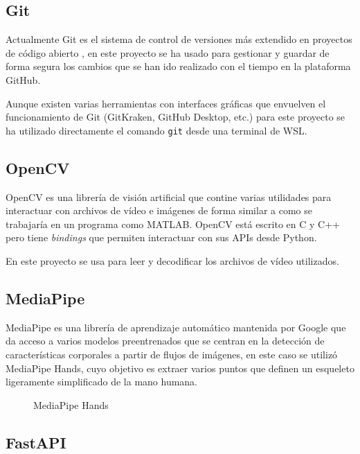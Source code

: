 \subsection{Git}

Actualmente Git es el sistema de control de versiones más extendido en proyectos
de código abierto \cite{OpenHubVCS}, en este proyecto se ha usado para gestionar
y guardar de forma segura los cambios que se han ido realizado con el tiempo en
la plataforma GitHub.

Aunque existen varias herramientas con interfaces gráficas que envuelven el
funcionamiento de Git (GitKraken, GitHub Desktop, etc.) para este proyecto se ha
utilizado directamente el comando \texttt{git} desde una terminal de WSL.


\subsection{OpenCV}

OpenCV es una librería de visión artificial que contine varias utilidades para
interactuar con archivos de vídeo e imágenes de forma similar a como se
trabajaría en un programa como MATLAB. OpenCV está escrito en C y C++ pero tiene
\textit{bindings} que permiten interactuar con sus APIs desde Python.

En este proyecto se usa para leer y decodificar los archivos de vídeo
utilizados.


\subsection{MediaPipe}

MediaPipe es una librería de aprendizaje automático mantenida por Google que da
acceso a varios modelos preentrenados que se centran en la detección de
características corporales a partir de flujos de imágenes, en este caso se
utilizó MediaPipe Hands, cuyo objetivo es extraer varios puntos que definen un
esqueleto ligeramente simplificado de la mano humana.

\begin{figure}[h]
      \centering
      \caption{MediaPipe Hands}
\end{figure}


\subsection{FastAPI}

